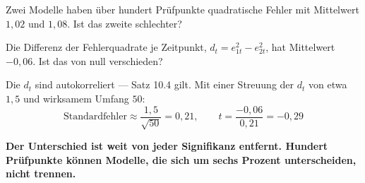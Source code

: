\begin{aufgabe}
Zwei Modelle haben über hundert Prüfpunkte quadratische Fehler mit Mittelwert $1{,}02$ und $1{,}08$. Ist das zweite schlechter?

\loesung
{}
Die Differenz der Fehlerquadrate je Zeitpunkt, $d_t = e_{1t}^{2} - e_{2t}^{2}$, hat Mittelwert $-0{,}06$. Ist das von null verschieden?

Die $d_t$ sind autokorreliert --- Satz 10.4 gilt. Mit einer Streuung der $d_t$ von etwa $1{,}5$ und wirksamem Umfang $50$:
\[ \text{Standardfehler} \approx \frac{1{,}5}{\sqrt{50}} = 0{,}21, \qquad t = \frac{-0{,}06}{0{,}21} = -0{,}29 \]

\begin{center}
\begin{minipage}{0.9\textwidth}
\textbf{Der Unterschied ist weit von jeder Signifikanz entfernt. Hundert Prüfpunkte können Modelle, die sich um sechs Prozent unterscheiden, nicht trennen.}
\end{minipage}
\end{center}

\begin{center}
\begin{minipage}{0.88\textwidth}
\end{minipage}
\end{center}
\end{aufgabe}

